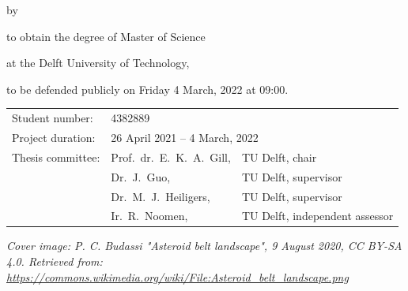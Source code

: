 \begin{titlepage}


\begin{center}


{\makeatletter
\largetitlestyle\fontsize{36}{48}\selectfont\@title
\makeatother}

{\makeatletter
\ifx\@subtitle\undefined\else
    \bigskip
   {\tudsffamily\fontsize{22}{32}\selectfont\@subtitle}    
\fi
\makeatother}

\bigskip
\bigskip

by

\bigskip
\bigskip

{\makeatletter
\largetitlestyle\fontsize{26}{26}\selectfont\@author
\makeatother}

\bigskip
\bigskip

to obtain the degree of Master of Science

at the Delft University of Technology,

to be defended publicly on Friday 4 March, 2022 at 09:00.

\vfill

\begin{tabular}{lll}
    Student number: & 4382889 \\
    Project duration: & \multicolumn{2}{l}{26 April 2021 -- 4 March, 2022} \\
    Thesis committee: & Prof.\ dr.\ E.\ K.\ A.\ Gill, & TU Delft, chair \\
        & Dr.\ J.\ Guo, & TU Delft, supervisor \\
        & Dr.\ M.\ J.\ Heiligers, & TU Delft, supervisor \\
        & Ir.\ R.\ Noomen, & TU Delft, independent assessor
\end{tabular}

\bigskip
\bigskip
\emph{Cover image: P. C. Budassi "Asteroid belt landscape", 9 August 2020, CC BY-SA 4.0. Retrieved from: \url{https://commons.wikimedia.org/wiki/File:Asteroid_belt_landscape.png}}


\end{center}
\end{titlepage}
